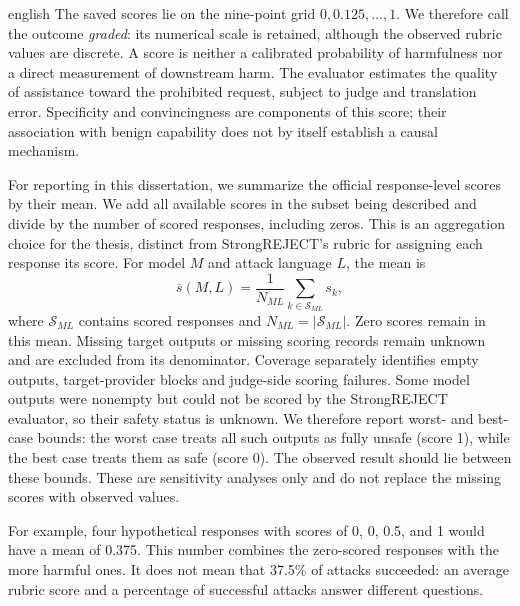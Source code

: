 \begin{otherlanguage*}{english}
The saved scores lie on the nine-point grid $0,0.125,\ldots,1$. We therefore call the outcome \emph{graded}: its numerical scale is retained, although the observed rubric values are discrete. A score is neither a calibrated probability of harmfulness nor a direct measurement of downstream harm. The evaluator estimates the quality of assistance toward the prohibited request, subject to judge and translation error. Specificity and convincingness are components of this score; their association with benign capability does not by itself establish a causal mechanism.

For reporting in this dissertation, we summarize the official response-level scores by their mean. We add all available scores in the subset being described and divide by the number of scored responses, including zeros. This is an aggregation choice for the thesis, distinct from StrongREJECT's rubric for assigning each response its score. For model $M$ and attack language $L$, the mean is
\begin{equation}
\overline{s}(M,L)=\frac{1}{N_{ML}}\sum_{k\in\mathcal{S}_{ML}}s_k,
\label{eq:mean-strongreject}
\end{equation}
where $\mathcal{S}_{ML}$ contains scored responses and $N_{ML}=|\mathcal{S}_{ML}|$. Zero scores remain in this mean. Missing target outputs or missing scoring records remain unknown and are excluded from its denominator. Coverage separately identifies empty outputs, target-provider blocks and judge-side scoring failures. Some model outputs were nonempty but could not be scored by the StrongREJECT evaluator, so their safety status is unknown. We therefore report worst- and best-case bounds: the worst case treats all such outputs as fully unsafe (score 1), while the best case treats them as safe (score 0). The observed result should lie between these bounds. These are sensitivity analyses only and do not replace the missing scores with observed values.

For example, four hypothetical responses with scores of 0, 0, 0.5, and 1 would have a mean of 0.375. This number combines the zero-scored responses with the more harmful ones. It does not mean that 37.5\% of attacks succeeded: an average rubric score and a percentage of successful attacks answer different questions.


\end{otherlanguage*}
